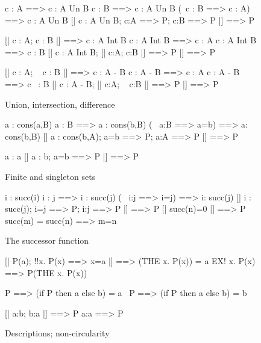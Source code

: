\begin{figure}
\begin{ttbox}
         c : A ==> c : A Un B
         c : B ==> c : A Un B
         (~c : B ==> c : A) ==> c : A Un B
          [| c : A Un B;  c:A ==> P;  c:B ==> P |] ==> P

         [| c : A;  c : B |] ==> c : A Int B
        c : A Int B ==> c : A
        c : A Int B ==> c : B
         [| c : A Int B;  [| c:A; c:B |] ==> P |] ==> P

        [| c : A;  ~ c : B |] ==> c : A - B
       c : A - B ==> c : A
       c : A - B ==> c ~: B
        [| c : A - B;  [| c:A; ~ c:B |] ==> P |] ==> P
\end{ttbox}
\caption{Union, intersection, difference} \label{zf-Un}
\end{figure}


\begin{figure}
\begin{ttbox}
       a : cons(a,B)
       a : B ==> a : cons(b,B)
       (~ a:B ==> a=b) ==> a: cons(b,B)
        [| a : cons(b,A);  a=b ==> P;  a:A ==> P |] ==> P

   a : {\ttlbrace}a{\ttrbrace}
   [| a : {\ttlbrace}b{\ttrbrace}; a=b ==> P |] ==> P
\end{ttbox}
\caption{Finite and singleton sets} \label{zf-upair2}
\end{figure}


\begin{figure}
\begin{ttbox}
       i : succ(i)
       i : j ==> i : succ(j)
       (~ i:j ==> i=j) ==> i: succ(j)
        [| i : succ(j);  i=j ==> P;  i:j ==> P |] ==> P
   [| succ(n)=0 |] ==> P
  succ(m) = succ(n) ==> m=n
\end{ttbox}
\caption{The successor function} \label{zf-succ}
\end{figure}


\begin{figure}
\begin{ttbox}
     [| P(a);  !!x. P(x) ==> x=a |] ==> (THE x. P(x)) = a
             EX! x. P(x) ==> P(THE x. P(x))

              P ==> (if P then a else b) = a
         ~P ==> (if P then a else b) = b

         [| a:b;  b:a |] ==> P
       a:a ==> P
\end{ttbox}
\caption{Descriptions; non-circularity} \label{zf-the}
\end{figure}


